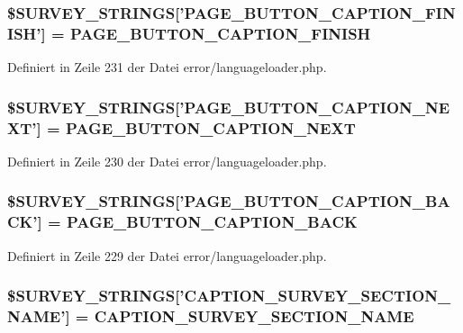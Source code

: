 \subsubsection{\setlength{\rightskip}{0pt plus 5cm}\$SURVEY\_\-STRINGS['{\bf PAGE\_\-BUTTON\_\-CAPTION\_\-FINISH}'] = {\bf PAGE\_\-BUTTON\_\-CAPTION\_\-FINISH}}\label{error_2languageloader_8php_ef8a30d248d4fa91d15b1d44ccfc3701}




Definiert in Zeile 231 der Datei error/languageloader.php.
\subsubsection{\setlength{\rightskip}{0pt plus 5cm}\$SURVEY\_\-STRINGS['{\bf PAGE\_\-BUTTON\_\-CAPTION\_\-NEXT}'] = {\bf PAGE\_\-BUTTON\_\-CAPTION\_\-NEXT}}\label{error_2languageloader_8php_de8c3149e008f02f971071eb64a80f0f}




Definiert in Zeile 230 der Datei error/languageloader.php.
\subsubsection{\setlength{\rightskip}{0pt plus 5cm}\$SURVEY\_\-STRINGS['{\bf PAGE\_\-BUTTON\_\-CAPTION\_\-BACK}'] = {\bf PAGE\_\-BUTTON\_\-CAPTION\_\-BACK}}\label{error_2languageloader_8php_0a1c04907ff4cd578db761f5abbd9bc8}




Definiert in Zeile 229 der Datei error/languageloader.php.
\subsubsection{\setlength{\rightskip}{0pt plus 5cm}\$SURVEY\_\-STRINGS['{\bf CAPTION\_\-SURVEY\_\-SECTION\_\-NAME}'] = {\bf CAPTION\_\-SURVEY\_\-SECTION\_\-NAME}}\label{error_2languageloader_8php_b000e9b366a7b8f555201e3b8ec2fbf8}




